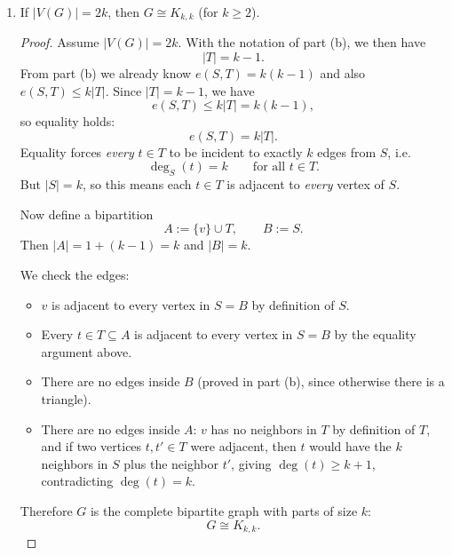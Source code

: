 \documentclass[11pt]{article}
\begin{document}
\begin{enumerate}
\begin{proof}
Therefore the number of edges between $S$ and $T$ (denoted as $e(S,T)$) is
\[
e(S,T)=\sum_{u\in S}(k-1)=k(k-1).
\]

On the other hand, each vertex $t\in T$ has total degree $k$, so it can be incident to \emph{at most}
$k$ edges coming from $S$. Hence
\[
k(k-1) \le \sum_{t\in T} k = k|T|\implies |T|\ge k-1.
\]
Thus
\[
|V(G)| = 1+|S|+|T| \ge 1+k+(k-1)=2k.
\]
\end{proof}

\item If $|V(G)|=2k$, then $G\cong K_{k,k}$ (for $k\ge 2$).

\begin{proof}
Assume $|V(G)|=2k$. With the notation of part (b), we then have
\[
 |T|=k-1.
\]
From part (b) we already know $e(S,T)=k(k-1)$ and also $e(S,T)\le k|T|$.
Since $|T|=k-1$, we have
\[
e(S,T)\le k|T| = k(k-1),
\]
so equality holds:
\[
e(S,T)=k|T|.
\]
Equality forces \emph{every} $t\in T$ to be incident to
exactly $k$ edges from $S$, i.e.
\[
\deg_S(t)=k \qquad \text{for all } t\in T.
\]
But $|S|=k$, so this means each $t\in T$ is adjacent to \emph{every} vertex of $S$.

Now define a bipartition
\[
A := \{v\}\cup T,\qquad B := S.
\]
Then $|A|=1+(k-1)=k$ and $|B|=k$.

We check the edges:
\begin{itemize}
\item $v$ is adjacent to every vertex in $S=B$ by definition of $S$.
\item Every $t\in T\subseteq A$ is adjacent to every vertex in $S=B$ by the equality argument above.
\item There are no edges inside $B$ (proved in part (b), since otherwise there is a triangle).
\item There are no edges inside $A$: $v$ has no neighbors in $T$ by definition of $T$,
and if two vertices $t,t'\in T$ were adjacent, then $t$ would have the $k$ neighbors in $S$
plus the neighbor $t'$, giving $\deg(t)\ge k+1$, contradicting $\deg(t)=k$.
\end{itemize}

Therefore $G$ is the complete bipartite graph with parts of size $k$:
\[
G \cong K_{k,k}.
\]
\end{proof}
\end{enumerate}
\end{document}
